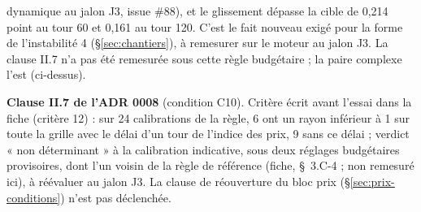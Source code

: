\documentclass[11pt,a4paper]{article}
\begin{document}
\begin{proposee}
dynamique au jalon J3, issue \#88), et le glissement dépasse la cible de 0,214 point au tour 60 et 0,161 au tour 120. C'est le fait nouveau exigé pour la forme de l'instabilité 4 (\S\ref{sec:chantiers}), à remesurer sur le moteur au jalon J3. La clause II.7 n'a pas été remesurée sous cette règle budgétaire ; la paire complexe l'est (ci-dessus).

\textbf{Clause II.7 de l'ADR 0008} (condition C10). Critère écrit avant l'essai dans la fiche (critère 12) : sur 24 calibrations de la règle, 6 ont un rayon inférieur à 1 sur toute la grille avec le délai d'un tour de l'indice des prix, 9 sans ce délai ; verdict « non déterminant » à la calibration indicative, sous deux réglages budgétaires provisoires, dont l'un voisin de la règle de référence (fiche, \S~3.C-4 ; non remesuré ici), à réévaluer au jalon J3. La clause de réouverture du bloc prix (\S\ref{sec:prix-conditions}) n'est pas déclenchée.


\end{proposee}
\end{document}

